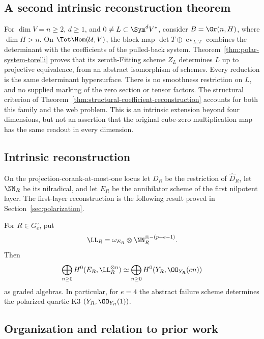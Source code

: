 \subsection{A second intrinsic reconstruction theorem}

For \(\dim V=n\ge2\), \(d\ge1\), and
\(0\ne L\subset\Sym^dV^*\), consider \(B=\Gr(n,H)\),
where \(\dim H>n\).  On \(\Tot\Hom(\mathcal U,V)\), the
block map \(\det T\oplus\operatorname{ev}_{L,T}\) combines
the determinant with the coefficients of the pulled-back system.
Theorem~\ref{thm:polar-system-torelli} proves that its zeroth-Fitting
scheme \(Z_L\) determines \(L\) up to projective equivalence,
from an abstract isomorphism of schemes.  Every reduction is the same
determinant hypersurface.  There is no smoothness restriction on
\(L\), and no supplied marking of the zero section or tensor factors.
The structural criterion of
Theorem~\ref{thm:structural-coefficient-reconstruction} accounts for
both this family and the web problem.  This is an intrinsic extension
beyond four dimensions, but not an assertion that the original
cube-zero multiplication map has the same readout in every dimension.

\subsection{Intrinsic reconstruction}

On the projection-corank-at-most-one locus let \(D_R\) be the
restriction of \(\widehat D_R\), let \(\NN_R\) be its
nilradical, and let \(E_R\) be the annihilator scheme of the first
nilpotent layer.  The first-layer reconstruction is the following result
proved in Section~\ref{sec:polarization}.

\begin{theorem}
\label{thm:main-reconstruction}
For \(R\in G_e^\circ\), put
\[
 \LL_R=\omega_{E_R}\otimes
 \NN_R^{\otimes-(p+e-1)}.
\]
Then
\[
 \bigoplus_{n\ge0}H^0(E_R,\LL_R^{\otimes n})
 \simeq
 \bigoplus_{n\ge0}H^0(Y_R,\OO_{Y_R}(en))
\]
as graded algebras.  In particular, for \(e=4\) the abstract
failure scheme determines the polarized quartic K3
\((Y_R,\OO_{Y_R}(1))\).
\end{theorem}


\subsection{Organization and relation to prior work}

